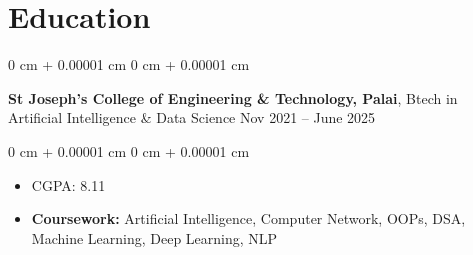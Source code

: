 \documentclass[10pt, letterpaper]{article}
\newenvironment{highlights}{
    \begin{itemize}[
        topsep=0.10 cm,
        parsep=0.10 cm,
        partopsep=0pt,
        itemsep=0pt,
        leftmargin=0 cm + 10pt
    ]
}{
    \end{itemize}
} %
\newenvironment{highlightsforbulletentries}{
    \begin{itemize}[
        topsep=0.10 cm,
        parsep=0.10 cm,
        partopsep=0pt,
        itemsep=0pt,
        leftmargin=10pt
    ]
}{
    \end{itemize}
} %
\newenvironment{onecolentry}{
    \begin{adjustwidth}{
        0 cm + 0.00001 cm
    }{
        0 cm + 0.00001 cm
    }
}{
    \end{adjustwidth}
} %
\newenvironment{twocolentry}[2][]{
    \onecolentry
    \def\secondColumn{#2}
    \setcolumnwidth{\fill, 4.5 cm}
    \begin{paracol}{2}
}{
    \switchcolumn \raggedleft \secondColumn
    \end{paracol}
    \endonecolentry
} %
\begin{document}







\section{Education}

\begin{twocolentry}{
        Nov 2021 – June 2025
    }
    \textbf{St Joseph's College of Engineering \& Technology, Palai}, Btech in Artificial Intelligence \& Data Science\end{twocolentry}

\vspace{0.10 cm}
\begin{onecolentry}
    \begin{highlights}
        \item CGPA: 8.11 %
        \item \textbf{Coursework:} Artificial Intelligence, Computer Network, OOPs, DSA, Machine Learning, Deep Learning, NLP
    \end{highlights}
\end{onecolentry}
\end{document}
